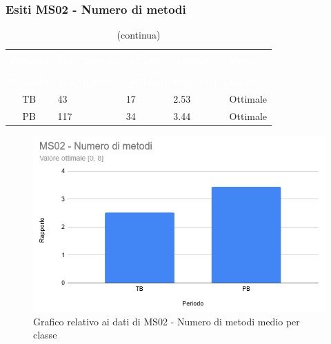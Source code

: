 \subsubsection{Esiti MS02 - Numero di metodi}
\begin{longtable}{c C{3cm} C{2cm} C{2cm} C{2cm}}
\caption{Esiti MS02 - Numero di metodi} \\
	\textcolor{white}{\textbf{Periodo}} &
	\textcolor{white}{\textbf{Tot\_metodi}} &
	\textcolor{white}{\textbf{\#Classi}} &
\textcolor{white}{\textbf{Rapporto}} &
\textcolor{white}{\textbf{Esito}} \\
	\endfirsthead
		\caption[]{(continua)} \\
		\textcolor{white}{\textbf{Periodo}} &
	\textcolor{white}{\textbf{Tot\_metodi}} &
	\textcolor{white}{\textbf{\#Classi}} &
\textcolor{white}{\textbf{Rapporto}} &
\textcolor{white}{\textbf{Esito}} \\
	\endhead
	TB & 43 & 17 & 2.53 & Ottimale \\
	PB & 117 & 34 & 3.44 & Ottimale \\
\end{longtable}

\begin{figure}[H]
\centering
\includegraphics[scale=0.7]{./img/MS02.png}
\caption{Grafico relativo ai dati di MS02 - Numero di metodi medio per classe}
\end{figure}

